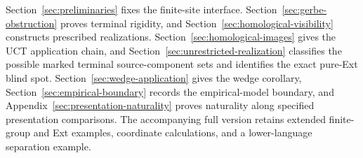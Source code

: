 Section~\ref{sec:preliminaries} fixes the finite-site interface.
Section~\ref{sec:gerbe-obstruction} proves terminal rigidity, and
Section~\ref{sec:homological-visibility} constructs prescribed realizations.
Section~\ref{sec:homological-images} gives the UCT application chain, and
Section~\ref{sec:unrestricted-realization} classifies the possible marked
terminal source-component sets and identifies the exact pure-Ext blind spot.
Section~\ref{sec:wedge-application} gives the wedge corollary,
Section~\ref{sec:empirical-boundary} records the empirical-model boundary,
and Appendix~\ref{sec:presentation-naturality} proves naturality along
specified presentation comparisons.
The accompanying full version retains extended finite-group and Ext examples,
coordinate calculations, and a lower-language separation example.
